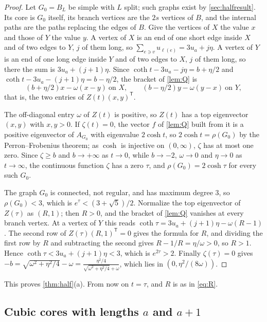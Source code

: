 \documentclass[11pt]{article}
\theoremstyle{definition}
\theoremstyle{remark}
\begin{document}
\begin{proof}
Let $G_0=B_L$ be simple with $L$ split; such graphs exist by \cref{sec:halfresult}. Its core is $G_0$ itself, its
branch vertices are the $2s$ vertices of $B$, and the internal paths are the paths replacing the edges of $B$. Give the
vertices of $X$ the value $x$ and those of $Y$ the value $y$. A vertex of $X$ is an end of one short edge inside $X$ and
of two edges to $Y$, $j$ of them long, so $\sum_{e\ni v}u_{\ell(e)}=3u_a+j\eta$. A vertex of $Y$ is an end of one long
edge inside $Y$ and of two edges to $X$, $j$ of them long, so there the sum is $3u_a+(j+1)\eta$. Since
$\coth t-3u_a-j\eta=b+\eta/2$ and $\coth t-3u_a-(j+1)\eta=b-\eta/2$, the bracket of \cref{lem:Q} is
\[
(b+\eta/2)x-\omega(x-y)\ \text{on }X,\qquad (b-\eta/2)y-\omega(y-x)\ \text{on }Y,
\]
that is, the two entries of $Z(t)(x,y)^{\mathsf T}$.

The off-diagonal entry $\omega$ of $Z(t)$ is positive, so $Z(t)$ has a top eigenvector $(x,y)$ with $x,y>0$. If
$\zeta(t)=0$, the vector $f$ of \cref{lem:Q} built from it is a positive eigenvector of $A_{G_0}$ with eigenvalue
$2\cosh t$, so $2\cosh t=\rho(G_0)$ by the Perron--Frobenius theorem; as $\cosh$ is injective on $(0,\infty)$, $\zeta$ has
at most one zero. Since $\zeta\ge b$ and $b\to+\infty$ as $t\to0$, while $b\to-2$, $\omega\to0$ and $\eta\to0$ as
$t\to\infty$, the continuous function $\zeta$ has a zero $\tau$, and $\rho(G_0)=2\cosh\tau$ for every such $G_0$.

The graph $G_0$ is connected, not regular, and has maximum degree $3$, so $\rho(G_0)<3$, which is
$e^\tau<(3+\sqrt5)/2$. Normalize the top eigenvector of $Z(\tau)$ as $(R,1)$; then $R>0$, and the bracket of
\cref{lem:Q} vanishes at every branch vertex. At a vertex of $Y$ this reads
$\coth\tau=3u_a+(j+1)\eta-\omega(R-1)$. The second row of $Z(\tau)(R,1)^{\mathsf T}=0$ gives the formula for $R$, and
dividing the first row by $R$ and subtracting the second gives $R-1/R=\eta/\omega>0$, so $R>1$. Hence
$\coth\tau<3u_a+(j+1)\eta<3$, which is $e^{2\tau}>2$. Finally $\zeta(\tau)=0$ gives
$-b=\sqrt{\omega^2+\eta^2/4}-\omega=\frac{\eta^2/4}{\sqrt{\omega^2+\eta^2/4}+\omega}$, which lies in
$(0,\eta^2/(8\omega))$.
\end{proof}

This proves \cref{thm:half}(a). From now on $t=\tau$, and $R$ is as in \eqref{eq:R}.

\subsection{Cubic cores with lengths \texorpdfstring{$a$}{a} and \texorpdfstring{$a+1$}{a+1}}
\end{document}
